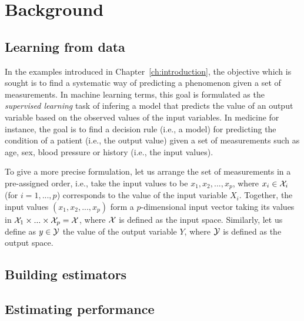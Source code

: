 \chapter{Background}\label{ch:background}

\section{Learning from data}

In the examples introduced in Chapter~\ref{ch:introduction}, the objective
which is sought is to find a systematic way of predicting a phenomenon given a
set of measurements. In machine learning terms, this goal is formulated as the
{\it supervised learning} task of infering a model that predicts the value of
an output variable based on the observed values of the input variables. In
medicine for instance, the goal is to find a decision rule (i.e., a model) for
predicting the condition of a patient (i.e., the output value) given a set of
measurements such as age, sex, blood pressure or history (i.e., the input
values).

To give a more precise formulation, let us arrange the set of measurements in a
pre-assigned order, i.e., take the input values to be $x_1, x_2, ..., x_p$,
where $x_i \in {\cal X}_i$ (for $i = 1, ..., p$) corresponds to the value of
the input variable $X_i$. Together, the input values $(x_1, x_2, ..., x_p)$
form a $p$-dimensional input vector taking its values in ${\cal X}_1 \times ...
\times {\cal X}_p = {\cal X}$, where ${\cal X}$ is defined as the input space.
Similarly, let us define as $y \in {\cal Y}$ the value of the output variable
$Y$, where ${\cal Y}$ is defined as the output space.





\section{Building estimators}


\section{Estimating performance}
